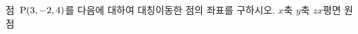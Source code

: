 점~$\mathrm{P}(3{,}\mkern3mu\mathopen{}-2{,}\mkern3mu\mathopen{}4)$를 다음에 대하여 대칭이동한 점의 좌표를 구하시오.
 $x$축
 $y$축
 $zx$평면
 원점
